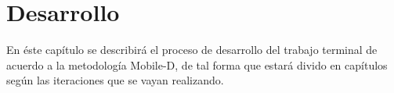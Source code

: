 \chapter{Desarrollo}

En éste capítulo se describirá el proceso de desarrollo del trabajo terminal de acuerdo a la metodología Mobile-D, de tal forma que estará divido en capítulos según las iteraciones que se vayan realizando.